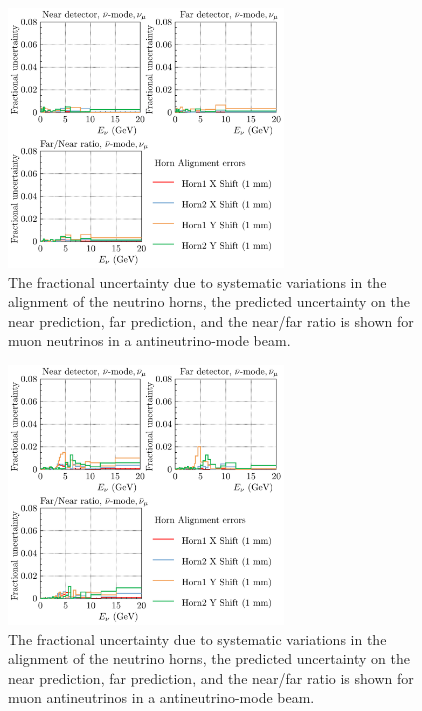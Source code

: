 \documentclass{article}
\begin{document}
\begin{figure}
  \centering
  \includegraphics[width=0.65\textwidth]{plots/fracerrs/nubarmode_numu_HornAlignment}
  \caption{The fractional uncertainty due to systematic variations in the alignment of the neutrino horns, the predicted uncertainty on the near prediction, far prediction, and the near/far ratio is shown for muon neutrinos in a antineutrino-mode beam.}
  \label{fig:hornalign_nubar_numu}
\end{figure}

\begin{figure}
  \centering
  \includegraphics[width=0.65\textwidth]{plots/fracerrs/nubarmode_numubar_HornAlignment}
  \caption{The fractional uncertainty due to systematic variations in the alignment of the neutrino horns, the predicted uncertainty on the near prediction, far prediction, and the near/far ratio is shown for muon antineutrinos in a antineutrino-mode beam.}
  \label{fig:hornalign_nubar_numubar}
\end{figure}
\end{document}
